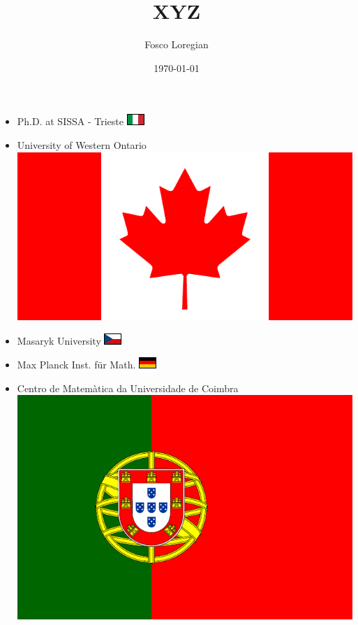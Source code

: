 \documentclass{beamer}
\author{Fosco Loregian \darkLogo}
\title{XYZ}
\date{\today}
\begin{document}
\begin{frame}
  \begin{itemize}
    \item Ph.D. at SISSA - Trieste \includegraphics{ita.pdf}

    \item University of Western Ontario \includegraphics[scale=.04]{can.pdf}
    
    \item Masaryk University \includegraphics{czr.pdf}
    
    \item Max Planck Inst. für Math. \includegraphics{ger.pdf}
    
    \item Centro de Matemàtica da Universidade de Coimbra \includegraphics[scale=.04]{por.pdf}
    

\end{itemize}
\end{frame}
\end{document}

